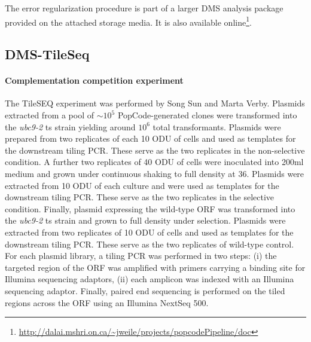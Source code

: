 The error regularization procedure is part of a larger DMS analysis package provided on the attached storage media. It is also available online\footnote{\url{http://dalai.mshri.on.ca/~jweile/projects/popcodePipeline/doc}}.


\subsection{DMS-TileSeq}

\paragraph{Complementation competition experiment} 
The TileSEQ experiment was performed by Song Sun and Marta Verby.
Plasmids extracted from a pool of $\sim 10^5$ PopCode-generated clones were transformed into the  \textit{ubc9-2} ts strain yielding around $10^6$ total transformants. Plasmids were prepared from two replicates of each 10 ODU of cells and used as templates for the downstream tiling PCR. These serve as the two replicates in the non-selective condition. A further two replicates of 40 ODU of cells were inoculated into 200ml medium and grown under continuous shaking to full density at 36\celsius. Plasmids were extracted from 10 ODU of each culture and were used as templates for the downstream tiling PCR. These serve as the two replicates in the selective condition. Finally, plasmid expressing the wild-type ORF was transformed into the  \textit{ubc9-2} ts strain and grown to full density under selection. Plasmids were extracted from two replicates of 10 ODU of cells and used as templates for the downstream tiling PCR. These serve as the two replicates of wild-type control. 
For each plasmid library, a tiling PCR was performed in two steps: (i) the targeted region of the ORF was amplified with primers carrying a binding site for Illumina sequencing adaptors, (ii) each amplicon was indexed with an Illumina sequencing adaptor. Finally, paired end sequencing is performed on the tiled regions across the ORF using an Illumina NextSeq 500. 

